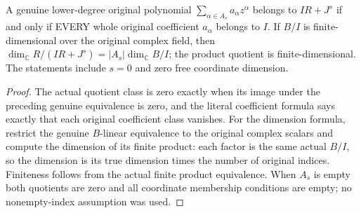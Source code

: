 \begin{corollary}
\label{hir:actual-product-normal-truncation-coefficient-membership-dimension}
\leanok
A genuine lower-degree original polynomial
$\sum_{\alpha\in A_s}a_\alpha z^\alpha$ belongs to $IR+J^s$ if and only if
EVERY whole original coefficient $a_\alpha$ belongs to $I$. If $B/I$ is
finite-dimensional over the original complex field, then
$\dim_\mathbb C R/(IR+J^s)=|A_s|\dim_\mathbb C B/I$; the product quotient
is finite-dimensional. The statements include $s=0$ and zero free
coordinate dimension.
\end{corollary}
\begin{proof}
The actual quotient class is zero exactly when its image under the
preceding genuine equivalence is zero, and the literal coefficient
formula says exactly that each original coefficient class vanishes.
For the dimension formula, restrict the genuine $B$-linear equivalence
to the original complex scalars and compute the dimension of its finite
product: each factor is the same actual $B/I$, so the dimension is its
true dimension times the number of original indices. Finiteness follows
from the actual finite product equivalence. When $A_s$ is empty both
quotients are zero and all coordinate membership conditions are empty;
no nonempty-index assumption was used.
\end{proof}
